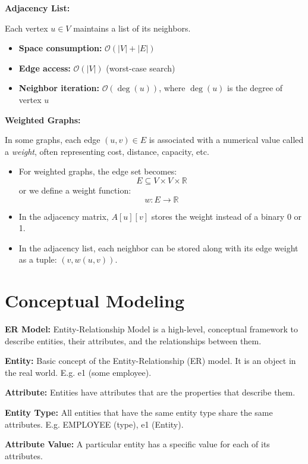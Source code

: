 \documentclass{article}
\begin{document}
\textbf{Adjacency List:}

Each vertex \( u \in V \) maintains a list of its neighbors.

\begin{itemize}
    \item \textbf{Space consumption:} \( \mathcal{O}(|V| + |E|) \)
    \item \textbf{Edge access:} \( \mathcal{O}(|V|) \) (worst-case search)
    \item \textbf{Neighbor iteration:} \( \mathcal{O}(\deg(u)) \), where \( \deg(u) \) is the degree of vertex \( u \)
\end{itemize}

    \textbf{Weighted Graphs:}  

    In some graphs, each edge \( (u, v) \in E \) is associated with a numerical value called a \textit{weight}, often representing cost, distance, capacity, etc.
    
    \begin{itemize}
        \item For weighted graphs, the edge set becomes:  
        \[
        E \subseteq V \times V \times \mathbb{R}
        \]
        or we define a weight function:  
        \[
        w : E \rightarrow \mathbb{R}
        \]
        \item In the adjacency matrix, \( A[u][v] \) stores the weight instead of a binary 0 or 1.
        \item In the adjacency list, each neighbor can be stored along with its edge weight as a tuple: \( (v, w(u, v)) \).
    \end{itemize}   
    
\section*{Conceptual Modeling}
\textbf{ER Model: }Entity-Relationship Model is a high-level, conceptual framework to describe entities, their attributes, and the relationships between them.

\textbf{Entity: }Basic concept of the Entity-Relationship (ER) model. It is an object in the real world. E.g. e1 (some employee).

\textbf{Attribute: }Entities have attributes that are the properties that describe them.

\textbf{Entity Type: }All entities that have the same entity type share the same attributes. E.g. EMPLOYEE (type), e1 (Entity).

\textbf{Attribute Value: }A particular entity has a specific value for each of its attributes.
\end{document}
